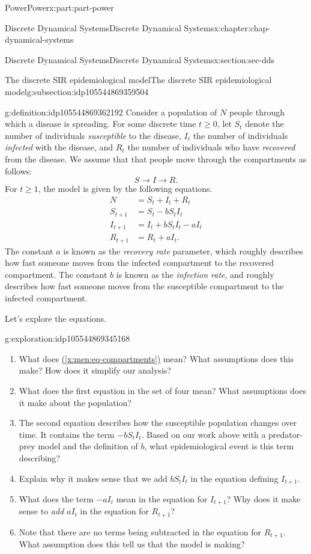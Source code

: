 \documentclass[oneside,10pt,]{book}
\newcommand{\xreffont}{\relax}
\numberwithin{equation}{section}
\renewcommand{\ge}{\geqslant}
\newcommand{\amp}{&}
\begin{document}
\begin{partptx}{Power}{}{Power}{}{}{x:part:part-power}
\begin{chapterptx}{Discrete Dynamical Systems}{}{Discrete Dynamical Systems}{}{}{x:chapter:chap-dynamical-systems}
\begin{sectionptx}{Discrete Dynamical Systems}{}{Discrete Dynamical Systems}{}{}{x:section:sec-dds}
\begin{subsectionptx}{The discrete SIR epidemiological model}{}{The discrete SIR epidemiological model}{}{}{g:subsection:idp105544869359504}
\begin{definition}{}{g:definition:idp105544869362192}
Consider a population of \(N\) people through which a disease is spreading. For some discrete time \(t \ge 0\), let \(S_t\) denote the number of individuals \emph{susceptible} to the disease, \(I_t\) the number of individuals \emph{infected} with the disease, and \(R_t\) the number of individuals who have \emph{recovered} from the disease. We assume that that people move through the compartments as follows:%
%
\begin{equation}
S \to I \to R.\label{x:men:eq-compartments}
\end{equation}
For \(t\ge 1\), the model is given by the following equations.%
%
\begin{align*}
N \amp = S_t + I_t + R_t\\
S_{t+1} \amp = S_t -b S_t I_t\\
I_{t+1} \amp = I_t + b S_t I_t - a I_t\\
R_{t+1} \amp = R_t + a I_t.
\end{align*}
The constant \(a\) is known as the \emph{recovery rate} parameter, which roughly describes how fast someone moves from the infected compartment to the recovered compartment. The constant \(b\) is known as the \emph{infection rate}, and roughly describes how fast someone moves from the susceptible compartment to the infected compartment.%
\end{definition}
Let's explore the equations.%
\begin{exploration}{}{g:exploration:idp105544869345168}%
%
\begin{enumerate}
\item{}What does \hyperref[x:men:eq-compartments]{({\xreffont\ref{x:men:eq-compartments}})} mean? What assumptions does this make? How does it simplify our analysis?%
\item{}What does the first equation in the set of four mean? What assumptions does it make about the population?%
\item{}The second equation describes how the susceptible population changes over time. It contains the term \(-b S_t I_t\). Based on our work above with a predator-prey model and the definition of \(b\), what epidemiological event is this term describing?%
\item{}Explain why it makes sense that we add \(b S_t I_t\) in the equation defining \(I_{t+1}\).%
\item{}What does the term \(-a I_t\) mean in the equation for \(I_{t+1}\)? Why does it make sense to \emph{add} \(a I_t\) in the equation for \(R_{t+1}\)?%
\item{}Note that there are no terms being subtracted in the equation for \(R_{t+1}\). What assumption does this tell us that the model is making?%

\end{enumerate}
\end{exploration}
\end{subsectionptx}
\end{sectionptx}
\end{chapterptx}
\end{partptx}
\end{document}
